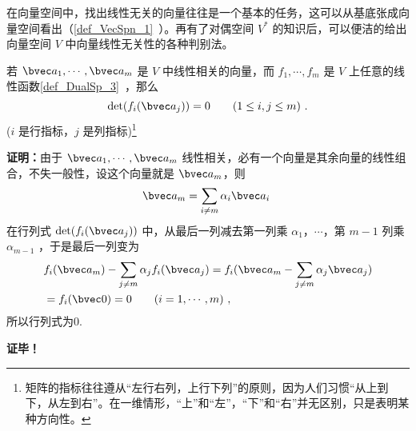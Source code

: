
\begin{issues}
\end{issues}


在向量空间中，找出线性无关的向量往往是一个基本的任务，这可以从基底张成向量空间看出（\autoref{def_VecSpn_1}~）。再有了对偶空间 $V^*$ 的知识后，可以便洁的给出向量空间 $V$ 中向量线性无关性的各种判别法。

\begin{lemma}{}\label{lem_LinInD_1}
若 $\bvec a_1,\cdots,\bvec a_m$ 是 $V$ 中线性相关的向量，而 $f_1,\cdots,f_m$ 是 $V$ 上任意的线性函数\autoref{def_DualSp_3}~，那么
\begin{equation}
\det(f_i(\bvec a_j))=0\qquad (1\leq i,j\leq m)~.
\end{equation}
($i$ 是行指标，$j$ 是列指标)\footnote{矩阵的指标往往遵从“左行右列，上行下列”的原则，因为人们习惯“从上到下，从左到右”。在一维情形，“上”和“左”，“下”和“右”并无区别，只是表明某种方向性。}
\end{lemma}
\textbf{证明：}由于 $\bvec a_1,\cdots,\bvec a_m$ 线性相关，必有一个向量是其余向量的线性组合，不失一般性，设这个向量就是 $\bvec a_m$，则
\begin{equation}
\bvec a_m=\sum_{i\neq m}\alpha_i\bvec a_i~
\end{equation}
在行列式 $\det(f_i(\bvec a_j))$ 中，从最后一列减去第一列乘 $\alpha_1$，$\cdots$，第 $m-1$ 列乘 $\alpha_{m-1}$ ，于是最后一列变为
\begin{equation}
\begin{aligned}
&f_i(\bvec a_m)-\sum_{j\neq m}\alpha_j f_i(\bvec a_j)=f_i(\bvec a_m-\sum_{j\neq m}\alpha_{j}\bvec a_j)\\
&=f_i(\bvec 0)=0 \qquad (i=1,\cdots ,m)~,
\end{aligned}
\end{equation}
所以行列式为0.

\textbf{证毕！}

